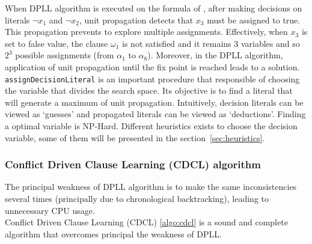 When DPLL algorithm is executed on the formula of , after making decisions on literals
$\neg x_1$ and $\neg x_2$, unit propagation detects that $x_3$ must be assigned to true.
This propagation prevents to explore  multiple assignments. Effectively, when $x_3$ is set to false value,
the clause $\omega_1$ is not satisfied and it remains 3 variables and so $2^3$ possible assignments
(from $\alpha_1$ to $\alpha_8$).
Moreover, in the DPLL algorithm, application of unit propagation until the fix point is reached leads  to a solution.
\texttt{assignDecisionLiteral} is an important procedure that responsible of choosing the variable that
divides the search space. Its objective is to find a literal that will generate a maximum of unit propagation. Intuitively, decision literals can be viewed as ‘guesses’ and propagated literals can be viewed as ‘deductions’. 
Finding a optimal variable is NP-Hard. Different heuristics exists to choose the decision variable,
some of them will be presented in the section~\ref{sec:heuristics}.

%
%
\subsubsection{Conflict Driven Clause Learning (CDCL) algorithm}\label{sec:cdcl}
The principal weakness of DPLL algorithm is to make the same inconsistencies several times
(principally due to chronological backtracking), leading to  unnecessary CPU usage.\\
Conflict Driven Clause Learning (CDCL) \cref{algo:cdcl} is a sound and complete algorithm
that overcomes principal the weakness of DPLL.

